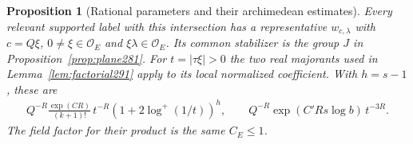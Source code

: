 \documentclass[a4paper,11pt]{article}
\newtheorem{proposition}{Proposition}[section]
\theoremstyle{definition}
\theoremstyle{remark}
\numberwithin{equation}{section}
\begin{document}
\begin{proposition}[Rational parameters and their archimedean estimates]\leavevmode
\label{prop:representative294}
Every relevant supported label with this intersection has
a representative \(w_{c,\lambda}\) with \(c=Q\xi\),
\(0\ne\xi\in\mathcal O_E\) and \(\xi\lambda\in\mathcal O_E\).
Its common stabilizer is the group \(J\) in
Proposition~\ref{prop:plane281}. For \(t=|\tau\xi|>0\)
the two real majorants used in Lemma~\ref{lem:factorial291}
apply to its local normalized coefficient. With \(h=s-1\),
these are
\[
 \begin{split}
 Q^{-R}\frac{\exp(CR)}{(k+1)!}\,t^{-R}
                      (1+2\log^+(1/t))^h,\qquad
 Q^{-R}\exp(C'Rs\log b)\,t^{-3R}.
 \end{split}
\]
The field factor for their product is the same \(C_E\le1\).
\end{proposition}
\end{document}
